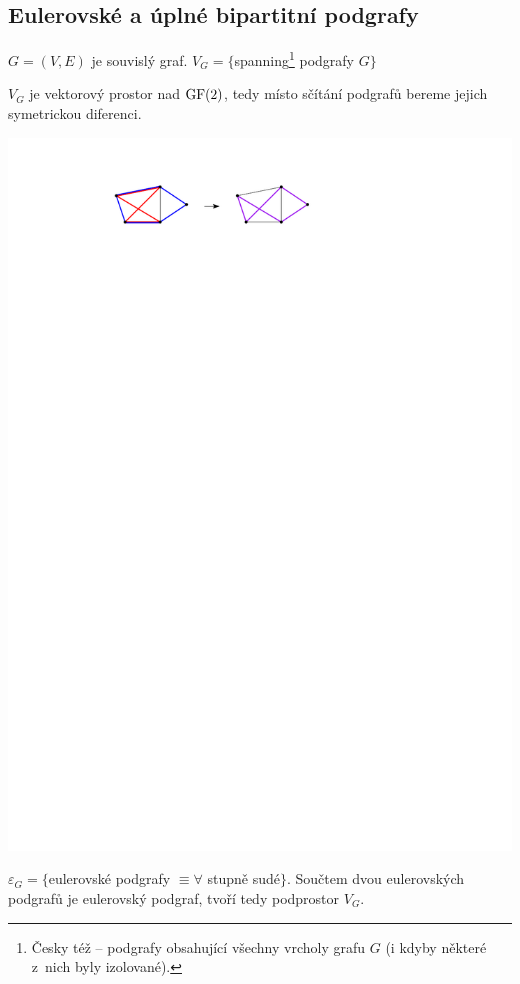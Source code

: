 \subsection{Eulerovské a úplné bipartitní podgrafy}


$G = (V,E)$ je souvislý graf. $V_G = \{$spanning\footnote{Česky též  --
podgrafy obsahující všechny vrcholy grafu $G$ (i kdyby některé z~nich byly
izolované).} podgrafy $G\}$

\tv $V_G$ je vektorový prostor nad $\mathrm{GF}(2)$, tedy místo sčítání podgrafů bereme jejich
symetrickou diferenci.

\begin{center}
	\includegraphics{symetricka_diference.pdf}
\end{center}

\df $\varepsilon_G = \{$eulerovské podgrafy $\equiv \forall $ stupně sudé$\}$. Součtem
dvou eulerovských podgrafů je eulerovský podgraf, tvoří tedy podprostor $V_G$.

